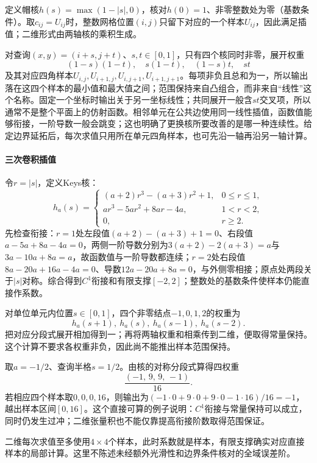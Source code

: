 定义帽核$h(s)=\max(1-|s|,0)$，核对$h(0)=1$、非零整数处为零（基数条件）。取$c_{ij}=U_{ij}$时，整数网格位置$(i,j)$只留下对应的一个样本$U_{ij}$，因此满足插值；二维形式由两轴核的乘积生成。

对查询$(x,y)=(i+s,j+t)$、$s,t\in[0,1]$，只有四个核同时非零，展开权重
\[
  (1-s)(1-t),\quad s(1-t),\quad (1-s)t,\quad st
\]
及其对应四角样本$U_{i,j},U_{i+1,j},U_{i,j+1},U_{i+1,j+1}$。每项非负且总和为一，所以输出落在这四个样本的最小值和最大值之间；范围保持来自凸组合，而非来自“线性”这个名称。固定一个坐标时输出关于另一坐标线性；共同展开一般含$st$交叉项，所以通常不是整个平面上的仿射函数。相邻单元在公共边使用同一线性插值，函数值能够衔接，一阶导数一般会跳变；这也明确了更换核所要改善的是哪一种连续性。给定边界延拓后，每次求值只用所在单元四角样本，也可先沿一轴再沿另一轴计算。

\paragraph{三次卷积插值}

令$r=|s|$，定义Keys核：
\[
  h_a(s)=
  \begin{cases}
    (a+2)r^3-(a+3)r^2+1,&0\le r\le1,\\
    ar^3-5ar^2+8ar-4a,&1<r<2,\\
    0,&r\ge2.
  \end{cases}
\]
先检查衔接：$r=1$处左段值$(a+2)-(a+3)+1=0$、右段值$a-5a+8a-4a=0$，两侧一阶导数分别为$3(a+2)-2(a+3)=a$与$3a-10a+8a=a$，故函数值与一阶导数都连续；$r=2$处右段值$8a-20a+16a-4a=0$、导数$12a-20a+8a=0$，与外侧零相接；原点处两段关于$|s|$对称。综合得到$C^1$衔接和有限支撑$[-2,2]$；整数处的基数条件使样本仍能直接作系数。

对单位单元内位置$s\in[0,1]$，四个非零结点$-1,0,1,2$的权重为
\[
  h_a(s+1),\ h_a(s),\ h_a(s-1),\ h_a(s-2).
\]
把对应分段式展开相加得到一；再将两轴权重和相乘传到二维，便取得常量保持。这个计算不要求各权重非负，因此尚不能推出样本范围保持。

\begin{example}[半格查询的过冲]
取$a=-1/2$、查询半格$s=1/2$。由核的对称分段式算得四权重
\[
  \frac{(-1,\,9,\,9,\,-1)}{16}.
\]
若相应四个样本取$0,0,0,16$，则输出为$(-1\cdot0+9\cdot0+9\cdot0-1\cdot16)/16=-1$，越出样本区间$[0,16]$。这个直接可算的例子说明：$C^1$衔接与常量保持可以成立，同时仍发生过冲；二维张量积也不能仅靠提高衔接阶数取得范围保证。
\end{example}

二维每次求值至多使用$4\times4$个样本，此时系数就是样本，有限支撑确实对应直接样本的局部计算。这里不陈述未经额外光滑性和边界条件核对的全域误差阶。

